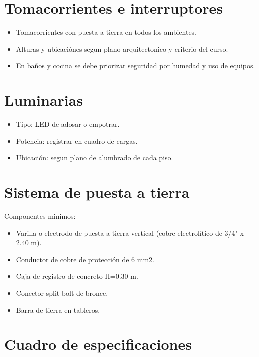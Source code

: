 \section{Tomacorrientes e interruptores}

\begin{itemize}
  \item Tomacorrientes con puesta a tierra en todos los ambientes.
  \item Alturas y ubicaciónes segun plano arquitectonico y criterio del curso.
  \item En baños y cocina se debe priorizar seguridad por humedad y uso de equipos.
\end{itemize}

\section{Luminarias}

\begin{itemize}
  \item Tipo: LED de adosar o empotrar.
  \item Potencia: registrar en cuadro de cargas.
  \item Ubicación: segun plano de alumbrado de cada piso.
\end{itemize}

\section{Sistema de puesta a tierra}

Componentes minimos:
\begin{itemize}
  \item Varilla o electrodo de puesta a tierra vertical (cobre electrolítico de 3/4" x 2.40 m).
  \item Conductor de cobre de protección de 6 mm2.
  \item Caja de registro de concreto H=0.30 m.
  \item Conector split-bolt de bronce.
  \item Barra de tierra en tableros.
\end{itemize}

\section{Cuadro de especificaciones}

